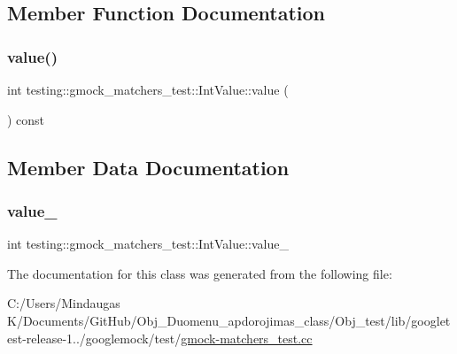\subsection{Member Function Documentation}
\mbox{\label{classtesting_1_1gmock__matchers__test_1_1_int_value_a6da000ea8ff787591e07ffaa3c1027d4}} 
\subsubsection{\texorpdfstring{value()}{value()}}
{\footnotesize\ttfamily int testing\+::gmock\+\_\+matchers\+\_\+test\+::\+Int\+Value\+::value (\begin{DoxyParamCaption}{ }\end{DoxyParamCaption}) const\hspace{0.3cm}{\ttfamily [inline]}}



\subsection{Member Data Documentation}
\mbox{\label{classtesting_1_1gmock__matchers__test_1_1_int_value_a1adaa220476c0f29549b36606df3155f}} 
\subsubsection{\texorpdfstring{value\_}{value\_}}
{\footnotesize\ttfamily int testing\+::gmock\+\_\+matchers\+\_\+test\+::\+Int\+Value\+::value\+\_\+\hspace{0.3cm}{\ttfamily [private]}}



The documentation for this class was generated from the following file\+:\begin{DoxyCompactItemize}
\item 
C\+:/\+Users/\+Mindaugas K/\+Documents/\+Git\+Hub/\+Obj\+\_\+\+Duomenu\+\_\+apdorojimas\+\_\+class/\+Obj\+\_\+test/lib/googletest-\/release-\/1../googlemock/test/\mbox{\hyperlink{_obj__test_2lib_2googletest-release-1_88_81_2googlemock_2test_2gmock-matchers__test_8cc}{gmock-\/matchers\+\_\+test.\+cc}}\end{DoxyCompactItemize}
